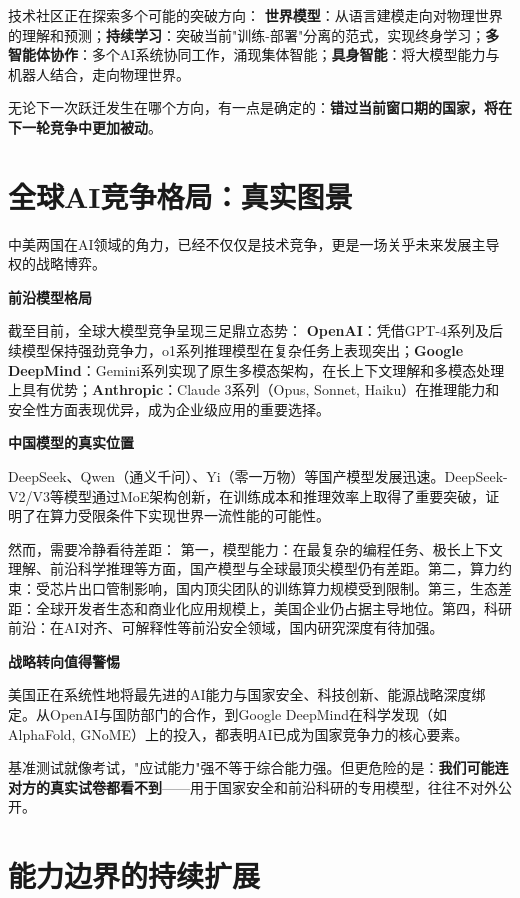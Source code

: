 技术社区正在探索多个可能的突破方向：
\textbf{世界模型}：从语言建模走向对物理世界的理解和预测；\textbf{持续学习}：突破当前"训练-部署"分离的范式，实现终身学习；\textbf{多智能体协作}：多个AI系统协同工作，涌现集体智能；\textbf{具身智能}：将大模型能力与机器人结合，走向物理世界。

无论下一次跃迁发生在哪个方向，有一点是确定的：\textbf{错过当前窗口期的国家，将在下一轮竞争中更加被动}。

\section{全球AI竞争格局：真实图景}

中美两国在AI领域的角力，已经不仅仅是技术竞争，更是一场关乎未来发展主导权的战略博弈。

\textbf{前沿模型格局}

截至目前，全球大模型竞争呈现三足鼎立态势：
\textbf{OpenAI}：凭借GPT-4系列及后续模型保持强劲竞争力，o1系列推理模型在复杂任务上表现突出；\textbf{Google DeepMind}：Gemini系列实现了原生多模态架构，在长上下文理解和多模态处理上具有优势；\textbf{Anthropic}：Claude 3系列（Opus, Sonnet, Haiku）在推理能力和安全性方面表现优异，成为企业级应用的重要选择。

\textbf{中国模型的真实位置}

DeepSeek、Qwen（通义千问）、Yi（零一万物）等国产模型发展迅速。DeepSeek-V2/V3等模型通过MoE架构创新，在训练成本和推理效率上取得了重要突破，证明了在算力受限条件下实现世界一流性能的可能性。

然而，需要冷静看待差距：
第一，模型能力：在最复杂的编程任务、极长上下文理解、前沿科学推理等方面，国产模型与全球最顶尖模型仍有差距。第二，算力约束：受芯片出口管制影响，国内顶尖团队的训练算力规模受到限制。第三，生态差距：全球开发者生态和商业化应用规模上，美国企业仍占据主导地位。第四，科研前沿：在AI对齐、可解释性等前沿安全领域，国内研究深度有待加强。

\textbf{战略转向值得警惕}

美国正在系统性地将最先进的AI能力与国家安全、科技创新、能源战略深度绑定。从OpenAI与国防部门的合作，到Google DeepMind在科学发现（如AlphaFold, GNoME）上的投入，都表明AI已成为国家竞争力的核心要素。

基准测试就像考试，"应试能力"强不等于综合能力强。但更危险的是：\textbf{我们可能连对方的真实试卷都看不到}——用于国家安全和前沿科研的专用模型，往往不对外公开。

\section{能力边界的持续扩展}

